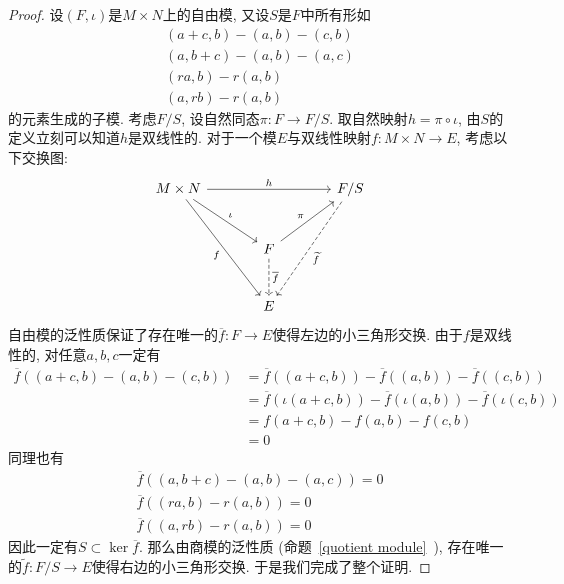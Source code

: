 \begin{proof}
    设$(F,\iota)$是$M\times N$上的自由模, 又设$S$是$F$中所有形如
    \begin{gather*}
        (a+c,b)-(a,b)-(c,b)\\
        (a,b+c)-(a,b)-(a,c)\\
        (ra,b)-r(a,b)\\
        (a,rb)-r(a,b)
    \end{gather*}
    的元素生成的子模.
    考虑$F/S$, 设自然同态$\pi:F\to F/S$.
    取自然映射$h=\pi\circ\iota$, 由$S$的定义立刻可以知道$h$是双线性的.
    对于一个模$E$与双线性映射$f:M\times N\to E$, 考虑以下交换图:
    \[\begin{tikzcd}[sep=large]
        M\times N \arrow[dr, "\iota"] \arrow[ddr, "f"'] \arrow[rr, "h"] &  & F/S \arrow[ddl, dashed, "\widetilde{f}"]\\
        & F \arrow[ur, "\pi"] \arrow[d, dashed, "\overline{f}"] & \\
        & E &
    \end{tikzcd}\]
    自由模的泛性质保证了存在唯一的$\overline{f}:F\to E$使得左边的小三角形交换.
    由于$f$是双线性的, 对任意$a,b,c$一定有
    \begin{align*}
        \overline{f}((a+c,b)-(a,b)-(c,b))&=\overline{f}((a+c,b))-\overline{f}((a,b))-\overline{f}((c,b))\\
        &=\overline{f}(\iota(a+c,b))-\overline{f}(\iota(a,b))-\overline{f}(\iota(c,b))\\
        &=f(a+c,b)-f(a,b)-f(c,b)\\
        &=0
    \end{align*}
    同理也有
    \begin{gather*}
        \overline{f}((a,b+c)-(a,b)-(a,c))=0\\
        \overline{f}((ra,b)-r(a,b))=0\\
        \overline{f}((a,rb)-r(a,b))=0
    \end{gather*}
    因此一定有$S\subset\ker{\overline{f}}$.
    那么由商模的泛性质 (命题~\ref{quotient module}~), 存在唯一的$\widetilde{f}:F/S\to E$使得右边的小三角形交换.
    于是我们完成了整个证明.
\end{proof}

